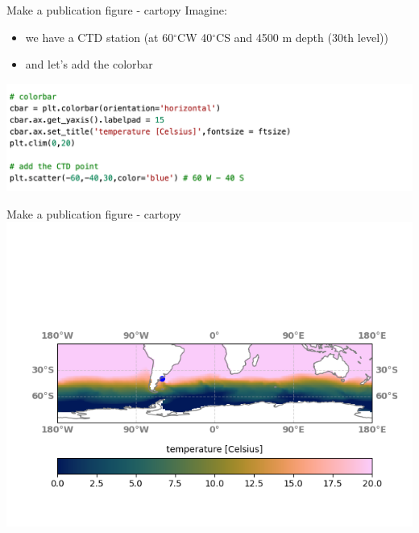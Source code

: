 \begin{frame}{\insertsectionnumber{ |} Make a publication figure - cartopy}
    Imagine: \\
    \begin{itemize}
        \item we have a CTD station (at 60$^{\circ}$CW 40$^{\circ}$CS and 4500 m depth (30th level)) 
            \vspace{0.3cm}
        \item and let's add the colorbar
    \end{itemize}
    \includegraphics[scale=0.35]{images/Script4_step5.png}
\end{frame}


\begin{frame}{\insertsectionnumber{ |} Make a publication figure - cartopy}
    \includegraphics[scale=0.60]{images/script2_fig4.png}
\end{frame}


